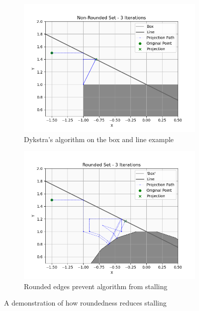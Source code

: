 \documentclass[hidelinks]{article}
\begin{document}
\begin{figure}[h!]
    \centering
    
    \begin{subfigure}[t]{0.49\textwidth}
        \centering
        \includegraphics[width=1\textwidth]{Latex/Current Version/Figures/non_rounded_test.png}
        \caption{Dykstra's algorithm on the box and line example}
        \label{fig:nonRounded}
    \end{subfigure}
    \hfill
    \begin{subfigure}[t]{0.49\textwidth}
        \centering
        \includegraphics[width=1\textwidth]{Latex/Current Version/Figures/rounded_test.png}
        \caption{Rounded edges prevent algorithm from stalling}
        \label{fig:Rounded}
    \end{subfigure}
    \caption{A demonstration of how roundedness reduces stalling}
    \label{fig:stall}
\end{figure}
\end{document}
